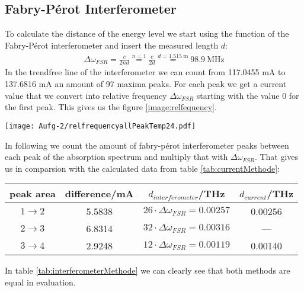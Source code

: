 \subsection*{Fabry-Pérot Interferometer}
To calculate the distance of the energy level we start using the function of the Fabry-Pérot interferometer and insert the measured length $d$:
\begin{gather}
    \Delta\omega_{FSR} = \frac{c}{2nd} \overset{n=1}{=} \frac{c}{2d} \overset{d=\SI{1.515}{\metre}}{=} \SI{98.9}{\mega\hertz} 
\end{gather}
In the trendfree line of the interferometer we can count from 117.0455 mA to 137.6816 mA an amount of 97 maxima peaks. For each peak we get a current value that we convert into relative frequency $\Delta\omega_{FSR}$ starting with the value 0 for the first peak. This gives us the figure \ref{image:relfequency}.
\begin{center}
    \texttt{[image: Aufg-2/relfrequencyallPeakTemp24.pdf]}
    \label{image:relfequency}
\end{center}

In following we count the amount of fabry-pérot interferometer peaks between each peak of the absorption spectrum and multiply that with $\Delta\omega_{FSR}$. That gives us in comparsion with the calculated data from table \ref{tab:currentMethode}:
\begin{center}
    \begin{tabular}{c | c c c}
        peak area & difference/mA & $d_{interferometer}$/THz & $d_{current}$/THz\\
        \hline
        $1 \rightarrow 2$ & 5.5838 & $26\cdot\Delta\omega_{FSR} = 0.00257$ & 0.00256\\
        $2 \rightarrow 3$ & 6.8314 & $32\cdot\Delta\omega_{FSR} = 0.00316$ &   ---  \\
        $3 \rightarrow 4$ & 2.9248 & $12\cdot\Delta\omega_{FSR} = 0.00119$ & 0.00140\\
    \end{tabular}
    \label{tab:interferometerMethode}
\end{center} 
In table \ref{tab:interferometerMethode} we can clearly see that both methods are equal in evaluation.
\newpage


